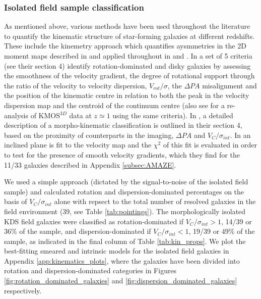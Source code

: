 \documentclass[fleqn,usenatbib]{mnras}
\begin{document}
\subsubsection{Isolated field sample classification}\label{subsubsection:isolated_classification}
As mentioned above, various methods have been used throughout the literature to quantify the kinematic structure of star-forming galaxies at different redshifts. 
These include the kinemetry approach which quantifies aysmmetries in the 2D moment maps described in \cite{Shapiro2008} and applied throughout in \cite{ForsterSchreiber2009} and \cite{Cresci2009}.
In \cite{Wisnioski2015} a set of 5 criteria (see their section 4) identify rotation-dominated and disky galaxies by assessing the smoothness of the velocity gradient, the degree of rotational support through the ratio of the velocity to velocity dispersion, $V_{rot}/\sigma$, the $\Delta PA$ misalignment and the position of the kinematic centre in relation to both the peak in the velocity dispersion map and the centroid of the continuum centre (also see \citealt{Rodrigues2017} for a re-analysis of KMOS$^{3D}$ data at $z\simeq1$ using the same criteria).   
In \cite{Epinat2012}, a detailed description of a morpho-kinematic classification is outlined in their section 4, based on the proximity of counterparts in the imaging, $\Delta PA$ and $V_{C}/\sigma_{int}$.
In \cite{Gnerucci2011} an inclined plane is fit to the velocity map and the $\chi^{2}$ of this fit is evaluated in order to test for the presence of smooth velocity gradients, which they find for the 11/33 galaxies described in Appendix \ref{subsec:AMAZE}.

We used a simple approach (dictated by the signal-to-noise of the isolated field sample) and calculated rotation and dispersion-dominated percentages on the basis of $V_{C}/\sigma_{int}$ alone with repsect to the total number of resolved galaxies in the field environment (39, see Table \ref{tab:pointings}).
The morphologically isolated KDS field galaxies were classified as rotation-dominated if $V_{C}/\sigma_{int} > 1$, 14/39 or 36\% of the sample, and dispersion-dominated if $V_{C}/\sigma_{int} < 1$, 19/39 or 49\% of the sample, as indicated in the final column of Table \ref{tab:kin_props}.
We plot the best-fitting smeared and intrinsic models for the isolated field galaxies in Appendix \ref{app:kinematics_plots}, where the galaxies have been divided into rotation and dispersion-dominated categories in Figures \ref{fig:rotation_dominated_galaxies} and \ref{fig:dispersion_dominated_galaxies} respectively.
\end{document}
